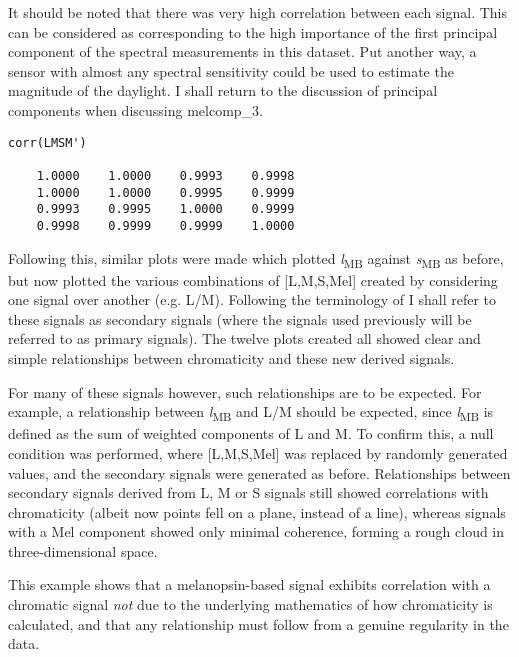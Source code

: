 \documentclass{article}
\begin{document}
It should be noted that there was very high correlation between each signal. This can be considered as corresponding to the high importance of the first principal component of the spectral measurements in this dataset. Put another way, a sensor with almost any spectral sensitivity could be used to estimate the magnitude of the daylight. I shall return to the discussion of principal components when discussing melcomp\_3.

\begin{minipage}{\linewidth}
\begin{lstlisting}
corr(LMSM')

    1.0000    1.0000    0.9993    0.9998
    1.0000    1.0000    0.9995    0.9999
    0.9993    0.9995    1.0000    0.9999
    0.9998    0.9999    0.9999    1.0000
\end{lstlisting}
\end{minipage}

Following this, similar plots were made which plotted \textit{l}\textsubscript{MB} against \textit{s}\textsubscript{MB} as before, but now plotted the various combinations of [L,M,S,Mel] created by considering one signal over another (e.g. L/M). Following the terminology of \cite{barrionuevo_contributions_2014} I shall refer to these signals as secondary signals (where the signals used previously will be referred to as primary signals). The twelve plots created all showed clear and simple relationships between chromaticity and these new derived signals.

For many of these signals however, such relationships are to be expected. For example, a relationship between \textit{l}\textsubscript{MB} and L/M should be expected, since \textit{l}\textsubscript{MB} is defined as the sum of weighted components of L and M. To confirm this, a null condition was performed, where [L,M,S,Mel] was replaced by randomly generated values, and the secondary signals were generated as before. Relationships between secondary signals derived from L, M or S signals still showed correlations with chromaticity (albeit now points fell on a plane, instead of a line), whereas signals with a Mel component showed only minimal coherence, forming a rough cloud in three-dimensional space. 

This example shows that a melanopsin-based signal exhibits correlation with a chromatic signal \emph{not} due to the underlying mathematics of how chromaticity is calculated, and that any relationship must follow from a genuine regularity in the data.
\end{document}
